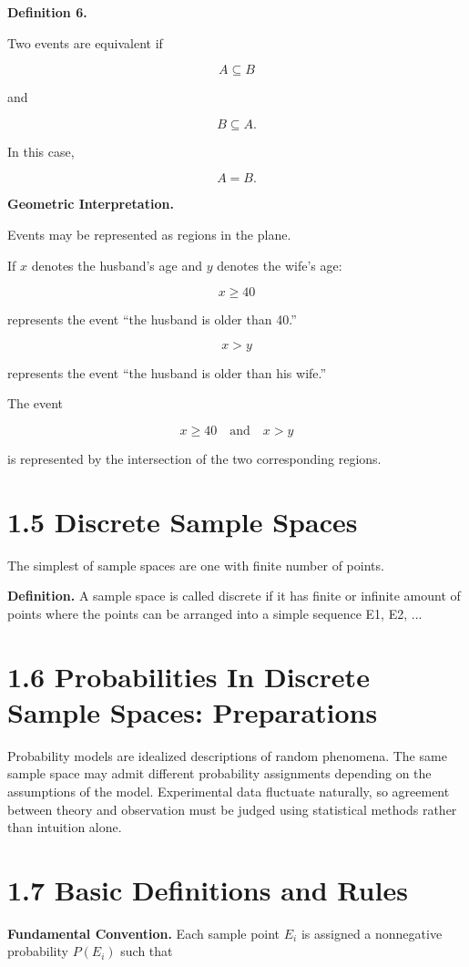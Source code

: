 \documentclass[12pt]{article}
\begin{document}
\textbf{Definition 6.}

Two events are equivalent if

\[
A\subseteq B
\]

and

\[
B\subseteq A.
\]

In this case,

\[
A=B.
\]

\textbf{Geometric Interpretation.}

Events may be represented as regions in the plane.

If \(x\) denotes the husband's age and \(y\) denotes the wife's age:

\[
x\ge 40
\]

represents the event ``the husband is older than 40.''

\[
x>y
\]

represents the event ``the husband is older than his wife.''

The event

\[
x\ge40 \quad \text{and} \quad x>y
\]

is represented by the intersection of the two corresponding regions.

\section*{1.5 Discrete Sample Spaces}
The simplest of sample spaces are one with finite number of points. 

\textbf{Definition.}
A sample space is called discrete if it has finite or infinite amount of points where the points can be arranged into a simple sequence E1, E2, ...

\section*{1.6 Probabilities In Discrete Sample Spaces: Preparations}
Probability models are idealized descriptions of random phenomena. The same sample space may admit different probability assignments depending on the assumptions of the model. Experimental data fluctuate naturally, so agreement between theory and observation must be judged using statistical methods rather than intuition alone.

\section*{1.7 Basic Definitions and Rules}

\textbf{Fundamental Convention.}
Each sample point \(E_i\) is assigned a nonnegative probability \(P(E_i)\) such that
\end{document}
